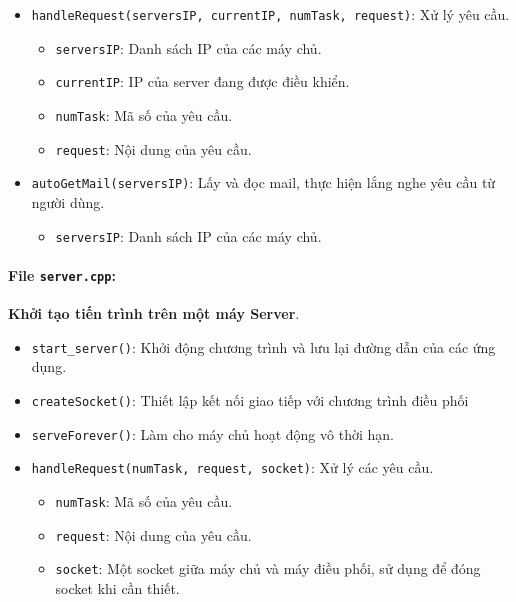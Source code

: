 \begin{itemize}
    \item \texttt{handleRequest(serversIP, currentIP, numTask, request)}: Xử lý yêu cầu.
    \begin{itemize}
        \item \texttt{serversIP}: Danh sách IP của các máy chủ.
        \item \texttt{currentIP}: IP của server đang được điều khiển.
        \item \texttt{numTask}: Mã số của yêu cầu.
        \item \texttt{request}: Nội dung của yêu cầu.
    \end{itemize}

    \item \texttt{autoGetMail(serversIP)}: Lấy và đọc mail, thực hiện lắng nghe yêu cầu từ người dùng.
    \begin{itemize}
        \item \texttt{serversIP}: Danh sách IP của các máy chủ.
    \end{itemize}
\end{itemize}


\paragraph{File \texttt{server.cpp}:}{\textbf{Khởi tạo tiến trình trên một máy Server}.}
\begin{itemize}
    \item \texttt{start\_server()}: Khởi động chương trình và lưu lại đường dẫn của các ứng dụng.

    \item \texttt{createSocket()}: Thiết lập kết nối giao tiếp với chương trình điều phối

    \item \texttt{serveForever()}: Làm cho máy chủ hoạt động vô thời hạn.

    \item \texttt{handleRequest(numTask, request, socket)}: Xử lý các yêu cầu.
    \begin{itemize}
        \item \texttt{numTask}: Mã số của yêu cầu.
        \item \texttt{request}: Nội dung của yêu cầu.
        \item \texttt{socket}: Một socket giữa máy chủ và máy điều phối, sử dụng để đóng socket khi cần thiết.
    \end{itemize}

\end{itemize}

